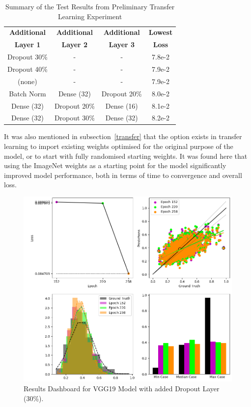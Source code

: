 \begin{table}[h!]
	\begin{center}
		
		\begin{tabular}{c|c|c|c} %
			\textbf{Additional} & \textbf{Additional} & \textbf{Additional} & \textbf{Lowest} \\
			
			\textbf{Layer 1} & \textbf{Layer 2} & \textbf{Layer 3} & \textbf{Loss} \\
			\hline
			Dropout 30\% & - & - & 7.8e-2  \\
			Dropout 40\% & - & - & 7.9e-2  \\ 
			(none) & - & - & 7.9e-2  \\
			Batch Norm & Dense (32) & Dropout 20\% & 8.0e-2  \\
			Dense (32) & Dropout 20\% & Dense (16) & 8.1e-2  \\
			Dense (32) & Dropout 30\% & Dense (32) & 8.2e-2  \\
		\end{tabular}
		\caption{Summary of the Test Results from Preliminary Transfer Learning Experiment}
		\label{tab:exp3}
	\end{center}
\end{table}

\noindent
It was also mentioned in subsection~\ref{transfer} that the option exists in transfer learning to import existing weights optimised for the original purpose of the model, or to start with fully randomised starting weights. It was found here that using the ImageNet weights as a starting point for the model significantly improved model performance, both in terms of time to convergence and overall loss.

\begin{figure}[p]
	\centering
	\includegraphics[scale=0.7]{Figures/transfer3.png}
	\caption{Results Dashboard for VGG19 Model with added Dropout Layer (30\%).}
	\label{fig:results_transfer}
\end{figure}

